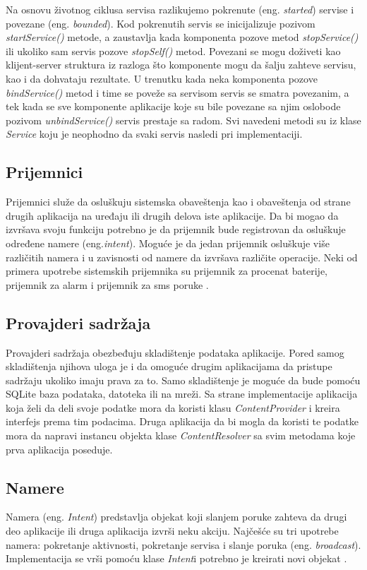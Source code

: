 \documentclass[android.tex]{subfiles}
\begin{document}
Na osnovu životnog ciklusa servisa razlikujemo pokrenute (eng. \textit{started}) servise i povezane (eng. \textit{bounded}). Kod pokrenutih servis se inicijalizuje pozivom \textit{startService() }metode, a zaustavlja kada komponenta pozove metod \textit{stopService() }ili ukoliko sam servis pozove\textit{ stopSelf() }metod. Povezani se mogu doživeti kao klijent-server struktura iz razloga što komponente mogu da šalju zahteve servisu, kao i da dohvataju rezultate. U trenutku kada neka komponenta pozove \textit{bindService()} metod i time se poveže sa servisom servis se smatra povezanim, a tek kada se sve komponente aplikacije koje su bile povezane sa njim oslobode pozivom \textit{unbindService()} servis prestaje sa radom. Svi navedeni metodi su iz klase \textit{Service} koju je neophodno da svaki servis nasledi pri implementaciji.


\subsection{Prijemnici}
Prijemnici služe da osluškuju sistemska obaveštenja kao i obaveštenja od strane drugih aplikacija na uređaju ili drugih delova iste aplikacije. Da bi mogao da izvršava svoju funkciju potrebno je da prijemnik bude registrovan da osluškuje određene namere (eng.\textit{intent}). Moguće je da jedan prijemnik osluškuje više različitih namera i u zavisnosti od namere da izvršava različite operacije. Neki od primera upotrebe sistemskih prijemnika su prijemnik za procenat baterije, prijemnik za alarm i prijemnik za sms poruke \cite{book:mzivkovic}. 

\subsection{Provajderi sadržaja}
Provajderi sadržaja obezbeđuju skladištenje podataka aplikacije. Pored samog skladištenja njihova uloga je i da omoguće drugim aplikacijama da pristupe sadržaju ukoliko imaju prava za to. Samo skladištenje je moguće da bude pomoću SQLite baza podataka, datoteka ili na mreži. Sa strane implementacije aplikacija koja želi da deli svoje podatke mora da koristi klasu \textit{ContentProvider} i kreira interfejs prema tim podacima. Druga aplikacija da bi mogla da  koristi te podatke mora da napravi instancu objekta klase \textit{ContentResolver} sa svim metodama koje prva aplikacija poseduje. 

\subsection{Namere}
\label{sec:namere}
Namera (eng. \textit{Intent}) predstavlja objekat koji slanjem poruke zahteva da drugi deo aplikacije ili druga aplikacija izvrši neku akciju. Najčešće su tri upotrebe namera: pokretanje aktivnosti, pokretanje servisa i slanje poruka (eng. \textit{broadcast}). Implementacija se vrši pomoću klase \textit{Intent}i potrebno je kreirati novi objekat \cite{sajt:androidDevelopers}. 
\end{document}

